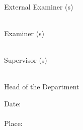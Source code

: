 \documentclass[12pt, a4paper]{report}
\begin{document}
\vspace*{3cm}
\begin{flushleft}
  \begin{minipage}{7.5cm}
    \hrulefill\\
    External Examiner (s)
  \end{minipage}
  \hfill
  \begin{minipage}{7.5cm}
    \hrulefill\\
    Examiner (s)
  \end{minipage}

  \vspace{2.0cm}
  \begin{minipage}{7.5cm}
    \hrulefill\\
    Supervisor (s)
  \end{minipage}
  \hfill
  \begin{minipage}{7.5cm}
    \hrulefill\\
    Head of the Department
  \end{minipage}
\begin{minipage}{7.5cm}
\vspace{2.0cm}
  Date: \hrulefill\\
  \vspace{0.2cm}\\
  Place: \hrulefill\\
\end{minipage}
\end{flushleft}

\end{document}
